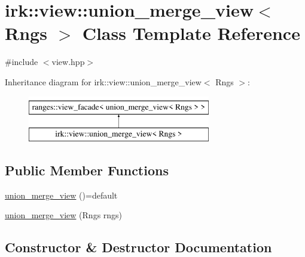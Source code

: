 \hypertarget{classirk_1_1view_1_1union__merge__view}{}\section{irk\+:\+:view\+:\+:union\+\_\+merge\+\_\+view$<$ Rngs $>$ Class Template Reference}
\label{classirk_1_1view_1_1union__merge__view}


{\ttfamily \#include $<$view.\+hpp$>$}

Inheritance diagram for irk\+:\+:view\+:\+:union\+\_\+merge\+\_\+view$<$ Rngs $>$\+:\begin{figure}[H]
\begin{center}
\leavevmode
\includegraphics[height=2.000000cm]{classirk_1_1view_1_1union__merge__view}
\end{center}
\end{figure}
\subsection*{Public Member Functions}
\begin{DoxyCompactItemize}
\item 
\mbox{\hyperlink{classirk_1_1view_1_1union__merge__view_a67de18521fcdb6d222fddc441fe827de}{union\+\_\+merge\+\_\+view}} ()=default
\item 
\mbox{\hyperlink{classirk_1_1view_1_1union__merge__view_af6199af626f858573667d182400d01ec}{union\+\_\+merge\+\_\+view}} (Rngs rngs)
\end{DoxyCompactItemize}


\subsection{Constructor \& Destructor Documentation}
\mbox{\label{classirk_1_1view_1_1union__merge__view_a67de18521fcdb6d222fddc441fe827de}} 
